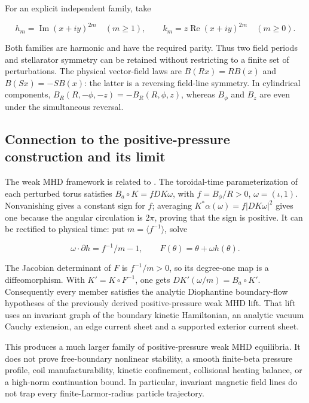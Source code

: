 For an explicit independent family, take

\[
h_m=\operatorname{Im}(x+iy)^{2m}\quad(m\geq1),\qquad
k_m=z\operatorname{Re}(x+iy)^{2m}\quad(m\geq0).
\]

Both families are harmonic and have the required parity. Thus two field periods and stellarator symmetry can be retained without restricting to a finite set of perturbations. The physical vector-field laws are \(B(Rx)=RB(x)\) and \(B(Sx)=-SB(x)\): the latter is a reversing field-line symmetry. In cylindrical components, \(B_R(R,-\phi,-z)=-B_R(R,\phi,z)\), whereas \(B_\phi\) and \(B_z\) are even under the simultaneous reversal.

\subsection{Connection to the positive-pressure construction and its limit}\label{connection-to-the-positive-pressure-construction-and-its-limit}

The weak MHD framework is related to \cite{elps}. The toroidal-time parameterization of each perturbed torus satisfies \(B_a\circ K=f DK\omega\), with \(f=B_\phi/R>0\), \(\omega=(\iota,1)\). Nonvanishing gives a constant sign for \(f\); averaging \(K^*\alpha(\omega)=f|DK\omega|^2\) gives one because the angular circulation is \(2\pi\), proving that the sign is positive. It can be rectified to physical time: put \(m=\langle f^{-1}\rangle\), solve

\[
\omega\cdot\partial h=f^{-1}/m-1,
\qquad F(\theta)=\theta+\omega h(\theta).
\]

The Jacobian determinant of \(F\) is \(f^{-1}/m>0\), so its degree-one map is a diffeomorphism. With \(K'=K\circ F^{-1}\), one gets \(DK'(\omega/m)=B_a\circ K'\). Consequently every member satisfies the analytic Diophantine boundary-flow hypotheses of the previously derived positive-pressure weak MHD lift. That lift uses an invariant graph of the boundary kinetic Hamiltonian, an analytic vacuum Cauchy extension, an edge current sheet and a supported exterior current sheet.

This produces a much larger family of positive-pressure weak MHD equilibria. It does not prove free-boundary nonlinear stability, a smooth finite-beta pressure profile, coil manufacturability, kinetic confinement, collisional heating balance, or a high-norm continuation bound. In particular, invariant magnetic field lines do not trap every finite-Larmor-radius particle trajectory.

